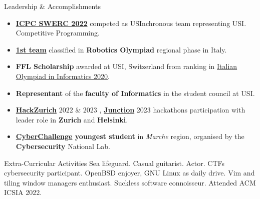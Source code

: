 \documentclass{cv} %
\begin{document}
\begin{rSection}{Leadership \& Accomplishments}
    \begin{itemize}
        \item \textbf{\href{https://swerc.eu/2022/teams/}{ICPC SWERC 2022}}
              competed as USInchronous team representing USI. Competitive Programming.

        \item \textbf{\href{https://www.makerslab.it/olimpiadi-robotiche-ancona-2019/}{1st team}}
              classified in \textbf{Robotics Olympiad} regional phase in Italy.

        \item \textbf{FFL Scholarship} awarded at USI, Switzerland from ranking in
              \href{https://www.olimpiadi-informatica.it/index.php/selezione-territoriale-20.html}{Italian Olympiad in Informatics 2020}.

        \item \textbf{Representant} of the \textbf{faculty of Informatics} in the student council at USI.

        \item \textbf{\href{https://hackzurich.com/}{HackZurich}} $2022$ \& $2023$ , \href{https://www.junction2023.com/}{\textbf{Junction}} 2023
              hackathons participation with leader role in \textbf{Zurich} and \textbf{Helsinki}.

        \item \textbf{\href{https://cyberchallenge.it/}{CyberChallenge} youngest student}
              in \textit{Marche} region, organised by the \textbf{Cybersecurity} National Lab.
    \end{itemize}
\end{rSection}

\begin{rSection}{Extra-Curricular Activities}
    Sea lifeguard.
    Casual guitarist.
    Actor.
    CTFs cybersecurity participant.
    OpenBSD enjoyer, GNU \text{+} Linux as daily drive.
    Vim and tiling window managers enthusiast.
    Suckless software connoisseur.
    Attended ACM ICSIA 2022.
\end{rSection}
\end{document}
